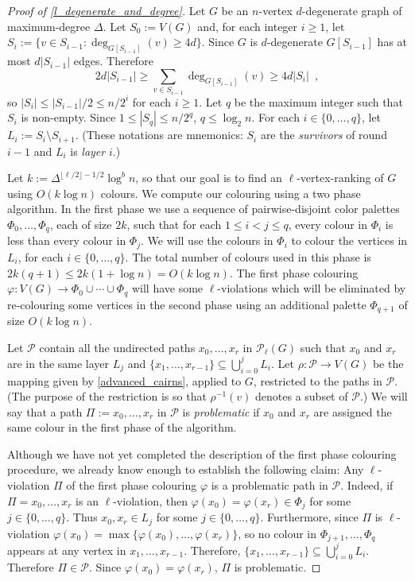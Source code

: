 \documentclass{patmorin}
\newcommand{\defin}[1]{\emph{\color{brightmaroon}#1}}
\begin{document}
\begin{proof}[Proof of \cref{l_degenerate_and_degree}]
  Let $G$ be an $n$-vertex $d$-degenerate graph of maximum-degree $\Delta$.  Let $S_0:=V(G)$ and, for each integer $i\ge 1$, let $S_i:=\{v\in S_{i-1}:\deg_{G[S_{i-1}]}(v)\ge 4d\}$.  Since $G$ is $d$-degenerate $G[S_{i-1}]$ has at most $d|S_{i-1}|$ edges.  Therefore
  \[
    2d|S_{i-1}|\ge \sum_{v\in S_{i-1}} \deg_{G[S_{i-1}]}(v)\ge 4d|S_i| \enspace ,
  \]
  so $|S_i|\le |S_{i-1}|/2\le n/2^i$ for each $i\ge 1$.  Let $q$ be the maximum integer such that $S_i$ is non-empty.  Since $1\le |S_q|\le n/2^q$, $q\le \log_2 n$.  For each $i\in\{0,\ldots,q\}$, let $L_i:=S_i\setminus S_{i+1}$.  (These notations are mnemonics: $S_i$ are the \defin{survivors} of round $i-1$ and $L_i$ is \defin{layer} $i$.)

  Let $k:=\Delta^{\lfloor\ell/2\rfloor-1/2}\log^b n$, so that our goal is to find an $\ell$-vertex-ranking of $G$ using $O(k\log n)$ colours. We compute our colouring using a two phase algorithm. In the first phase we use a sequence of pairwise-disjoint color palettes $\Phi_0,\ldots,\Phi_{q}$, each of size $2k$, such that for each $1\le i < j\le q$, every colour in $\Phi_i$ is less than every colour in $\Phi_j$.  We will use the colours in $\Phi_i$ to colour the vertices in $L_i$, for each $i\in\{0,\ldots,q\}$.  The total number of colours used in this phase is $2k(q+1)\le 2k(1+\log n)= O(k\log n)$.  The first phase colouring $\varphi:V(G)\to\Phi_0\cup\cdots\cup\Phi_q$ will have some $\ell$-violations which will be eliminated by re-colouring some vertices in the second phase using an additional palette $\Phi_{q+1}$ of size $O(k\log n)$.

  Let $\mathcal{P}$ contain all the undirected paths $x_0,\ldots,x_r$ in $\mathcal{P}_{\ell}(G)$ such that $x_0$ and $x_r$ are in the same layer $L_j$ and $\{x_1,\ldots,x_{r-1}\}\subseteq \bigcup_{i=0}^j L_i$.  Let $\rho:\mathcal{P}\to V(G)$ be the mapping given by \cref{advanced_cairns}, applied to $G$, restricted to the paths in $\mathcal{P}$. (The purpose of the restriction is so that $\rho^{-1}(v)$ denotes a subset of $\mathcal{P}$.)  We will say that a path $\Pi:=x_0,\ldots,x_r$ in $\mathcal{P}$ is \defin{problematic} if $x_0$ and $x_r$ are assigned the same colour in the first phase of the algorithm.

  Although we have not yet completed the description of the first phase colouring procedure, we already know enough to establish the following claim:  Any $\ell$-violation $\Pi$ of the first phase colouring $\varphi$ is a problematic path in $\mathcal{P}$.  Indeed, if $\Pi=x_0,\ldots,x_r$ is an $\ell$-violation, then $\varphi(x_0)=\varphi(x_r)\in \Phi_j$ for some $j\in\{0,\ldots,q\}$.  Thus $x_0,x_r\in L_j$ for some $j\in\{0,\ldots,q\}$.  Furthermore, since $\Pi$ is $\ell$-violation $\varphi(x_0)=\max\{\varphi(x_0),\ldots,\varphi(x_r)\}$, so no colour in $\Phi_{j+1},\ldots,\Phi_q$ appears at any vertex in $x_1,\ldots,x_{r-1}$.  Therefore, $\{x_1,\ldots,x_{r-1}\}\subseteq \bigcup_{i=0}^j L_i$.  Therefore $\Pi\in\mathcal{P}$.  Since $\varphi(x_0)=\varphi(x_r)$, $\Pi$ is problematic.


\end{proof}
\end{document}

